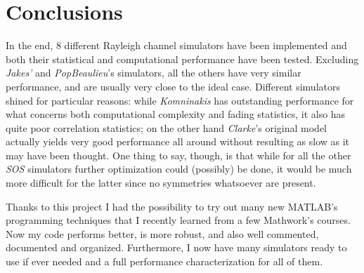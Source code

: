 \section{Conclusions} %
\label{sec:conclusions}

In the end, 8 different Rayleigh channel simulators have been implemented and both their statistical and computational performance have been tested. Excluding \textit{Jakes'} and \textit{PopBeaulieu}'s simulators, all the others have very similar performance, and are usually very close to the ideal case. Different simulators shined for particular reasons: while \textit{Komninakis} has outstanding performance for what concerns both computational complexity and fading statistics, it also has quite poor correlation statistics; on the other hand \textit{Clarke}'s original model actually yields very good performance all around without resulting as slow as it may have been thought. One thing to say, though, is that while for all the other \textit{SOS} simulators further optimization could (possibly) be done, it would be much more difficult for the latter since no symmetries whatsoever are present.

Thanks to this project I had the possibility to try out many new MATLAB's programming techniques that I recently learned from a few Mathwork's courses. Now my code performs better, is more robust, and also well commented, documented and organized. Furthermore, I now have many simulators ready to use if ever needed and a full performance characterization for all of them.